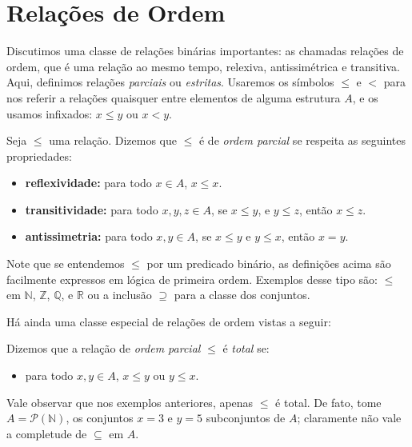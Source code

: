 \section{Relações de Ordem}
Discutimos uma classe de relações binárias importantes: as chamadas relações de ordem, que é uma relação ao mesmo tempo, relexiva, antissimétrica e transitiva. Aqui, definimos relações \textit{parciais} ou \textit{estritas}.
Usaremos os símbolos $\leq$ e $<$ para nos referir a relações quaisquer entre elementos de alguma estrutura $A$, e os usamos infixados: $x \leq y$ ou $x < y$.

\begin{definition}
    \label{partial_order}
    Seja $\leq$ uma relação. Dizemos que $\leq$ é de \textit{ordem parcial} se respeita as seguintes propriedades:

    \begin{itemize}
        \item \textbf{reflexividade:} para todo $x \in A$, $x\leq x$.
        \item \textbf{transitividade:} para todo $x,y,z \in A$, se $x \leq y$, e $y \leq z$, então $x\leq z$.
        \item \textbf{antissimetria:} para todo $x,y \in A$, se $x\leq y$ e $y \leq x$, então $x=y$.
    \end{itemize}
\end{definition}

\noindent Note que se entendemos $\leq$ por um predicado binário, as definições acima são facilmente expressos em lógica de primeira ordem.
Exemplos desse tipo são: $\leq$ em $\mathbb{N}$, $\mathbb{Z}$, $\mathbb{Q}$, e $\mathbb{R}$ ou a inclusão $\supseteq$ para a classe dos conjuntos.

Há ainda uma classe especial de relações de ordem vistas a seguir:

\begin{definition}
    \label{partial_order_total}
    Dizemos que a relação de \textit{ordem parcial} $\leq$ é \textit{total} se:

    \begin{itemize}
        \item para todo $x, y \in A$, $x\leq y$ ou $y\leq x$.
    \end{itemize}
\end{definition}

\noindent Vale observar que nos exemplos anteriores, apenas $\leq$ é total.
De fato, tome $A = \mathcal{P}(\mathbb{N}) $, os conjuntos $x={3}$ e $y={5}$ subconjuntos de $A$; claramente não vale a completude de $\subseteq$ em $A$. %

